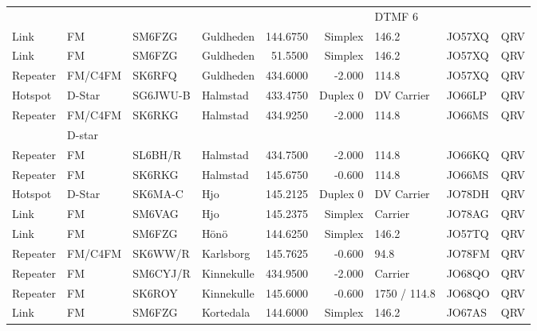 \begin{landscape}
\begin{longtable}{llllrrlll}
         &           &          &                   &              &            & DTMF 6       &             &          \\
Link     & FM        & SM6FZG   & Guldheden         & 144.6750     & Simplex    & 146.2        & JO57XQ      & QRV      \\
Link     & FM        & SM6FZG   & Guldheden         & 51.5500      & Simplex    & 146.2        & JO57XQ      & QRV      \\
Repeater & FM/C4FM   & SK6RFQ   & Guldheden         & 434.6000     & -2.000     & 114.8        & JO57XQ      & QRV      \\
Hotspot  & D-Star    & SG6JWU-B & Halmstad          & 433.4750     & Duplex 0   & DV Carrier   & JO66LP      & QRV      \\
Repeater & FM/C4FM   & SK6RKG   & Halmstad          & 434.9250     & -2.000     & 114.8        & JO66MS      & QRV      \\
         & D-star    &          &                   &              &            &              &             &          \\
Repeater & FM        & SL6BH/R  & Halmstad          & 434.7500     & -2.000     & 114.8        & JO66KQ      & QRV      \\
Repeater & FM        & SK6RKG   & Halmstad          & 145.6750     & -0.600     & 114.8        & JO66MS      & QRV      \\
Hotspot  & D-Star    & SK6MA-C  & Hjo               & 145.2125     & Duplex 0   & DV Carrier   & JO78DH      & QRV      \\
Link     & FM        & SM6VAG   & Hjo               & 145.2375     & Simplex    & Carrier      & JO78AG      & QRV      \\
Link     & FM        & SM6FZG   & Hönö              & 144.6250     & Simplex    & 146.2        & JO57TQ      & QRV      \\
Repeater & FM/C4FM   & SK6WW/R  & Karlsborg         & 145.7625     & -0.600     & 94.8         & JO78FM      & QRV      \\
Repeater & FM        & SM6CYJ/R & Kinnekulle        & 434.9500     & -2.000     & Carrier      & JO68QO      & QRV      \\
Repeater & FM        & SK6ROY   & Kinnekulle        & 145.6000     & -0.600     & 1750 / 114.8 & JO68QO      & QRV      \\
Link     & FM        & SM6FZG   & Kortedala         & 144.6000     & Simplex    & 146.2        & JO67AS      & QRV      \\

\end{longtable}
\end{landscape}
